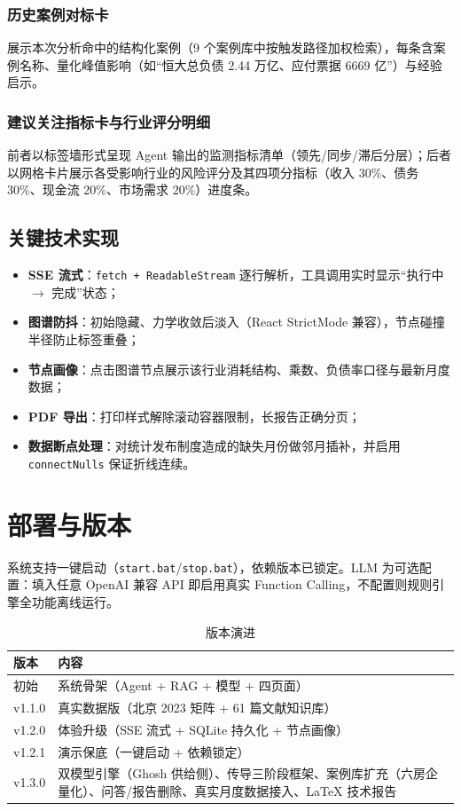\documentclass[12pt, a4paper]{ctexart}
\begin{document}
\subsubsection{历史案例对标卡}

展示本次分析命中的结构化案例（9 个案例库中按触发路径加权检索），每条含案例名称、量化峰值影响（如``恒大总负债 2.44 万亿、应付票据 6669 亿''）与经验启示。

\subsubsection{建议关注指标卡与行业评分明细}

前者以标签墙形式呈现 Agent 输出的监测指标清单（领先/同步/滞后分层）；后者以网格卡片展示各受影响行业的风险评分及其四项分指标（收入 30\%、债务 30\%、现金流 20\%、市场需求 20\%）进度条。

\subsection{关键技术实现}

\begin{itemize}[nosep]
  \item \textbf{SSE 流式}：\texttt{fetch + ReadableStream} 逐行解析，工具调用实时显示``执行中 $\to$ 完成''状态；
  \item \textbf{图谱防抖}：初始隐藏、力学收敛后淡入（React StrictMode 兼容），节点碰撞半径防止标签重叠；
  \item \textbf{节点画像}：点击图谱节点展示该行业消耗结构、乘数、负债率口径与最新月度数据；
  \item \textbf{PDF 导出}：打印样式解除滚动容器限制，长报告正确分页；
  \item \textbf{数据断点处理}：对统计发布制度造成的缺失月份做邻月插补，并启用 \texttt{connectNulls} 保证折线连续。
\end{itemize}

\section{部署与版本}

系统支持一键启动（\texttt{start.bat}/\texttt{stop.bat}），依赖版本已锁定。LLM 为可选配置：填入任意 OpenAI 兼容 API 即启用真实 Function Calling，不配置则规则引擎全功能离线运行。

\begin{table}[htbp]
\centering
\caption{版本演进}
\begin{tabular}{@{}p{2cm}p{12.5cm}@{}}
\toprule
版本 & 内容 \\
\midrule
初始 & 系统骨架（Agent + RAG + 模型 + 四页面） \\
v1.1.0 & 真实数据版（北京 2023 矩阵 + 61 篇文献知识库） \\
v1.2.0 & 体验升级（SSE 流式 + SQLite 持久化 + 节点画像） \\
v1.2.1 & 演示保底（一键启动 + 依赖锁定） \\
v1.3.0 & 双模型引擎（Ghosh 供给侧）、传导三阶段框架、案例库扩充（六房企量化）、问答/报告删除、真实月度数据接入、LaTeX 技术报告 \\
\bottomrule
\end{tabular}
\end{table}
\end{document}
